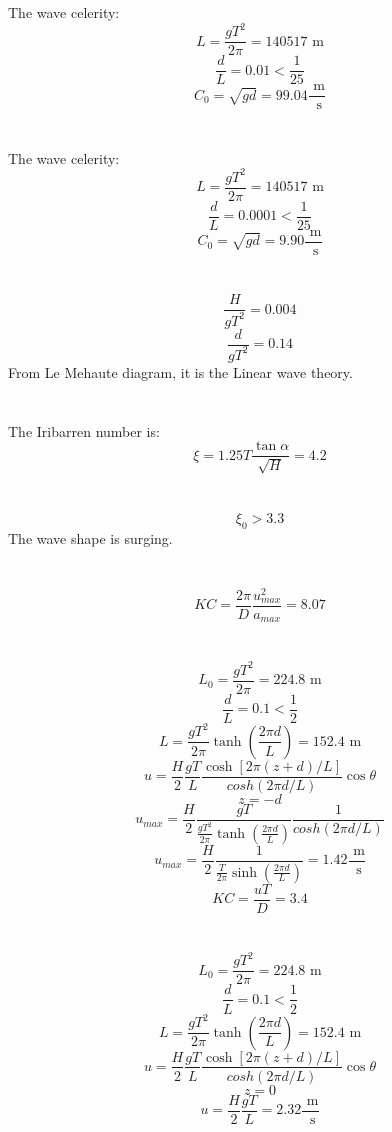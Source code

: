 \documentclass[a4paper,12pt]{article}
\begin{document}
\section{}
The wave celerity:
\[
L = \frac{g T^2}{2 \pi} = 140517 \textrm{ m}
\]
\[
\frac{d}{L} = 0.01 < \frac{1}{25}
\]
\[
C_0 = \sqrt{g d} = 99.04 \frac{\textrm{ m}}{\textrm{ s}}
\]

\section{}
The wave celerity:
\[
L = \frac{g T^2}{2 \pi} = 140517 \textrm{ m}
\]
\[
\frac{d}{L} = 0.0001 < \frac{1}{25}
\]
\[
C_0 = \sqrt{g d} = 9.90 \frac{\textrm{ m}}{\textrm{ s}}
\]

\section{}
\[
\frac{H}{g T^2} = 0.004
\]
\[
\frac{d}{g T^2} = 0.14
\]
From Le Mehaute diagram, it is the Linear wave theory.

\section{}
The Iribarren number is:
\[
\xi = 1.25 T \frac{\tan \alpha}{\sqrt{H}} = 4.2
\]

\section{}
\[
\xi_0 > 3.3
\]
The wave shape is surging.

\section{}
\[
KC = \frac{2 \pi}{D} \frac{u_{max}^2}{a_{max}} = 8.07
\]

\section{}
\[
L_0 = \frac{g T^2}{2 \pi} = 224.8 \textrm{ m}
\]
\[
\frac{d}{L} = 0.1 < \frac{1}{2}
\]
\[
L = \frac{g T^2}{2 \pi} \tanh(\frac{2 \pi d}{L}) = 152.4 \textrm{ m}
\]
\[
u = \frac{H}{2} \frac{g T}{L} \frac{\cosh[2 \pi (z + d) / L]}{cosh(2 \pi d/L)} \cos \theta
\]
\[
z = -d
\]
\[
u_{max} = \frac{H}{2} \frac{g T}{\frac{g T^2}{2 \pi} \tanh(\frac{2 \pi d}{L})} \frac{1}{cosh(2 \pi d/L)}
\]
\[
u_{max} = \frac{H}{2} \frac{1}{\frac{T}{2 \pi} \sinh(\frac{2 \pi d}{L})} = 1.42 \frac{\textrm{ m}}{\textrm{ s}}
\]
\[
KC = \frac{u T}{D} = 3.4
\]

\section{}
\[
L_0 = \frac{g T^2}{2 \pi} = 224.8 \textrm{ m}
\]
\[
\frac{d}{L} = 0.1 < \frac{1}{2}
\]
\[
L = \frac{g T^2}{2 \pi} \tanh(\frac{2 \pi d}{L}) = 152.4 \textrm{ m}
\]
\[
u = \frac{H}{2} \frac{g T}{L} \frac{\cosh[2 \pi (z + d) / L]}{cosh(2 \pi d/L)} \cos \theta
\]
\[
z = 0
\]
\[
u = \frac{H}{2} \frac{g T}{L} = 2.32 \frac{\textrm{ m}}{\textrm{ s}}
\]
\end{document}
